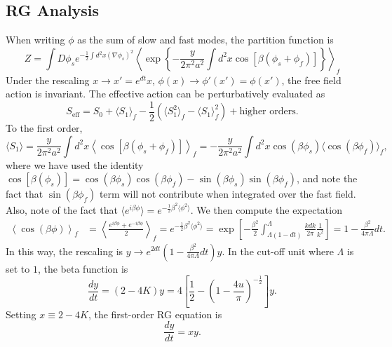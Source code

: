 \documentclass[aps,prb,superscriptaddress,nofootinbib]{revtex4}
\begin{document}
\subsection{RG Analysis}
When writing $\phi$ as the sum of slow and fast modes, the partition function is
\begin{equation*}
	Z = \int D\phi_s e^{-\frac{1}{2}\int d^2x (\nabla\phi_s)^2}
	\left\langle\exp\left\{-\frac{y}{2\pi^2 a^2} \int d^2 x \cos\left[\beta(\phi_s+\phi_f)\right] \right\}\right\rangle_f
\end{equation*}
Under the rescaling $x \rightarrow x' = e^{dt} x$, $\phi(x) \rightarrow \phi'(x') = \phi(x')$, the free field action is invariant.
The effective action can be perturbatively evaluated as
\begin{equation*}
	S_{\mathrm{eff}} = S_0 + \langle S_1\rangle_f - \frac{1}{2}(\langle S_1^2\rangle_f - \langle S_1\rangle_f^2) + \text{higher orders}.
\end{equation*}
To the first order, 
\begin{equation*}
	\langle S_1\rangle = \frac{y}{2\pi^2 a^2} \int d^2 x \left\langle\cos\left[\beta(\phi_s+\phi_f)\right] \right\rangle_f 
	= -\frac{y}{2\pi^2 a^2} \int d^2 x \cos(\beta\phi_s)\langle\cos(\beta\phi_f)\rangle_f,
\end{equation*}
where we have used the identity $\cos\left[\beta(\phi_s)\right] = \cos(\beta\phi_s)\cos(\beta\phi_f)-\sin(\beta\phi_s)\sin(\beta\phi_f)$,
and note the fact that $\sin(\beta\phi_f)$ term will not contribute when integrated over the fast field. 
Also, note of the fact that $\langle e^{i\beta\phi}\rangle = e^{-\frac{1}{2}\beta^2 \langle\phi^2\rangle}$.
We then compute the expectation
\begin{equation*}
\begin{aligned}
	\left\langle \cos(\beta\phi)\right\rangle_f
	&= \left\langle \frac{e^{i\beta\phi} + e^{-i\beta\phi}}{2}\right\rangle_f
	= e^{-\frac{1}{2}\beta^2\langle\phi^2\rangle} 
	= \exp\left[-\frac{\beta^2}{2}\int^\Lambda_{\Lambda(1-dt)}\frac{k dk}{2\pi} \frac{1}{k^2} \right] 
	= 1-\frac{\beta^2}{4\pi\Lambda}dt.
\end{aligned}
\end{equation*}
In this way, the rescaling is $y \rightarrow e^{2dt}\left(1-\frac{\beta^2}{4\pi\Lambda}dt\right) y$.
In the cut-off unit where $\Lambda$ is set to $1$, the beta function is
\begin{equation*}
	\frac{dy}{dt} = (2-4K) y = 4\left[\frac{1}{2}-\left(1-\frac{4u}{\pi}\right)^{-\frac{1}{2}}\right]y.
\end{equation*}
Setting $x\equiv 2-4K$, the first-order RG equation is
\begin{equation}
	\frac{dy}{dt} = xy.
\end{equation}
\end{document}

